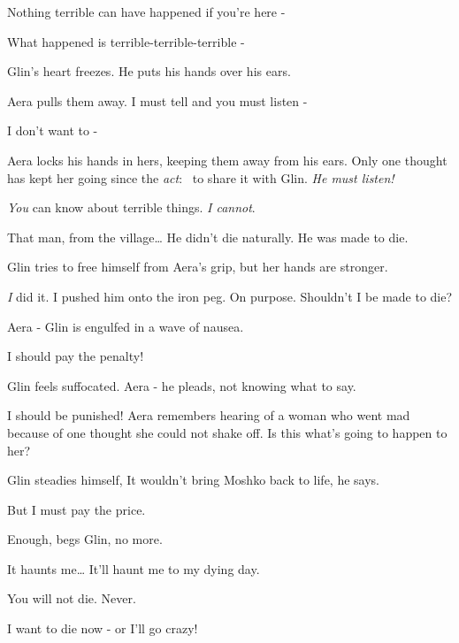 \documentclass[letterpaper]{article}
\begin{document}
{\textquotedbl}Nothing terrible can have happened if you're here -{\textquotedbl} 

{\textquotedbl}What happened is terrible-terrible-terrible -{\textquotedbl} 

Glin's heart freezes. He puts his hands over his ears. 

Aera pulls them away. {\textquotedbl}I must tell and you must listen -{\textquotedbl} 

{\textquotedbl}I don't want to -{\textquotedbl} 

Aera locks his hands in hers, keeping them away from his ears. Only one thought has kept her going since the
\textit{act}: \ to share it with Glin. \textit{He must listen! }

{\textquotedbl}\textit{You} can know about terrible things. \textit{I cannot}.{\textquotedbl} 

{\textquotedbl}That man, from the village{\dots} He didn't die naturally. He was made to die.{\textquotedbl} 

Glin tries to free himself from Aera's grip, but her hands are stronger. 

{\textquotedbl}\textit{I} did it. I pushed him onto the iron peg. On purpose. Shouldn't I be made to die?{\textquotedbl}


{\textquotedbl}Aera -{\textquotedbl} Glin is engulfed in a wave of nausea. 

{\textquotedbl}I should pay the penalty!{\textquotedbl}

Glin feels suffocated. {\textquotedbl}Aera -{\textquotedbl} he pleads, not knowing what to say. 

{\textquotedbl}I should be punished!{\textquotedbl} Aera remembers hearing of a woman who went mad because of one
thought she could not shake off. Is this what's going to happen to her? 

Glin steadies himself, {\textquotedbl}It wouldn't bring Moshko back to life,{\textquotedbl} he says. 

{\textquotedbl}But I must pay the price.{\textquotedbl} 

{\textquotedbl}Enough,{\textquotedbl} begs Glin, {\textquotedbl}no more.{\textquotedbl} 

{\textquotedbl}It haunts me{\dots} It'll haunt me to my dying day.{\textquotedbl} 

{\textquotedbl}You will not die. Never.{\textquotedbl} 

{\textquotedbl}I want to die now - or I'll go crazy!{\textquotedbl} 
\end{document}

